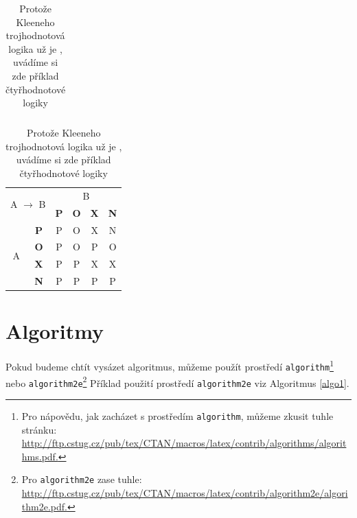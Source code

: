 \documentclass[a4paper,11pt]{article}
\begin{document}
\begin{table}[h]
\begin{center}
\begin{tabular}{|c|c|c|c|c|c|}
            \end{tabular}
            \begin{tabular}{|c|c|c|c|c|c|}
                \hline
                \multicolumn{2}{|c|}{\multirow{2}{*}{{A $\rightarrow$ B}}} & \multicolumn{4}{c|}{B} \\
                \cline{3-6}
                \multicolumn{2}{|c|}{} & \textbf{P} & \textbf{O} &\textbf{X}& \textbf{N} \\
                \hline
                \multirow{4}{*}{A} & \textbf{P} & P & O & X & N \\
                \cline{2-6}
                & \textbf{O} & P & O & P & O \\
                \cline{2-6}
                & \textbf{X} & P & P & X & X \\
                \cline{2-6}
                & \textbf{N} & P & P & P & P \\
                \hline
            \end{tabular}
        \caption{Protože Kleeneho trojhodnotová logika už je , uvádíme si zde příklad čtyřhodnotové logiky}
    \end{center}
\end{table}
\pagebreak   

\section{Algoritmy}
\label{algo}
Pokud budeme chtít vysázet algoritmus, můžeme použít prostředí \texttt{algorithm}\footnote{Pro nápovědu, jak zacházet s prostředím  \texttt{algorithm}, můžeme zkusit tuhle stránku: \\
\hyperlink{http://ftp.cstug.cz/pub/tex/CTAN/macros/latex/contrib/algorithms/algorithms.pdf}{http://ftp.cstug.cz/pub/tex/CTAN/macros/latex/contrib/algorithms/algorithms.pdf.}} nebo \texttt{algorithm2e}\footnote{Pro \texttt{algorithm2e} zase tuhle:
\hyperlink{http://ftp.cstug.cz/pub/tex/CTAN/macros/latex/contrib/algorithm2e/algorithm2e.pdf}{http://ftp.cstug.cz/pub/tex/CTAN/macros/latex/contrib/algorithm2e/algorithm2e.pdf.}}
Příklad použití prostředí \texttt{algorithm2e} viz Algoritmus \ref{algo1}.
\vspace{2em}
\end{document}
